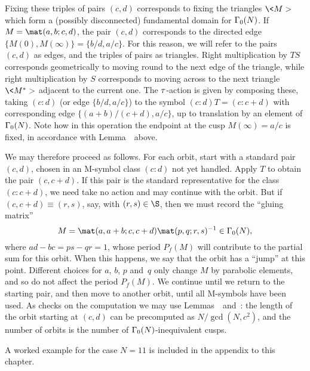 Fixing these triples of pairs $(c,d)$ corresponds to fixing the
triangles $\<M>$ which form a (possibly disconnected) fundamental
domain for $\G0(N)$.  If $M=\mat(a,b;c,d)$, the pair $(c,d)$
corresponds to the directed edge $\{M(0),M(\infty)\} = \{b/d,a/c\}$.
For this reason, we will refer to the pairs $(c,d)$ as edges, and the
triples of pairs as triangles.  Right multiplication by $TS$
corresponds geometrically to moving round to the next edge of the
triangle, while right multiplication by $S$ corresponds to moving
across to the next triangle $\<M^*>$ adjacent to the current one.  The
$\tau$-action is given by composing these, taking $(c:d)$ (or edge
$\{b/d,a/c\}$) to the symbol $(c:d)T=(c:c+d)$ with corresponding edge
$\{(a+b)/(c+d),a/c\}$, up to translation by an element of $\G0(N)$.
Note how in this operation the endpoint at the cusp $M(\infty)=a/c$ is
fixed, in accordance with Lemma~\orbitslemma\ above.

We may therefore proceed as follows.  For each orbit, start with a
standard pair $(c,d)$, chosen in an M-symbol class $(c:d)$ not yet
handled.  Apply $T$ to obtain the pair $(c,c+d)$.  If this pair is the
standard representative for the class $(c:c+d)$, we need take no
action and may continue with the orbit.  But if $(c,c+d)\equiv(r,s)$,
say, with $(r,s)\in\S$, then we must record the ``gluing matrix''
$$ 
   M = \mat(a,a+b;c,c+d)\mat(p,q;r,s)^{-1} \in\Gamma_0(N), 
$$ 
where $ad-bc = ps-qr = 1$, whose period $P_f(M)$ will contribute to
the partial sum for this orbit.  When this happens, we say that the
orbit has a ``jump'' at this point.  Different choices for $a$, $b$,
$p$ and~$q$ only change $M$ by parabolic elements, and so do not
affect the period $P_f(M)$.  We continue until we return to the
starting pair, and then move to another orbit, until all M-symbols
have been used.  As checks on the computation we may use
Lemmas~\orbitslemma\ and~\orblengthlemma: the length of the orbit
starting at $(c,d)$ can be precomputed as $N/\gcd(N,c^2)$, and the
number of orbits is the number of $\G0(N)$-inequivalent cusps.

\medskip

A worked example for the case $N=11$ is included in the appendix to
this chapter.


\enddocument

